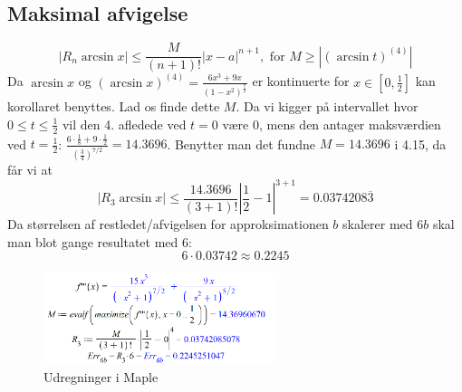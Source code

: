 \documentclass{report}
\begin{document}
\subsection{Maksimal afvigelse}
\begin{equation}
    |R_n\arcsin{x}|\leq\frac{M}{(n+1)!}|x-a|^{n+1},\text{ for }M\geq|(\arcsin{t})^{(4)}|
\end{equation}{}
Da $\arcsin{x}$ og $(\arcsin{x})^{(4)}=\frac{6x^3+9x}{(1-x^2)^{\frac{7}{2}}}$ er kontinuerte for $x\in[0,\frac{1}{2}]$ kan korollaret benyttes. Lad os finde dette $M$. Da vi kigger på intervallet hvor $0\leq t\leq\frac{1}{2}$ vil den 4. afledede ved $t=0$ være 0, mens den antager maksværdien ved $t=\frac{1}{2}$: $\frac{6\cdot\frac{1}{8}+9\cdot\frac{1}{2}}{(\frac{3}{4})^{7/2}}=14.3696$. Benytter man det fundne $M=14.3696$ i 4.15, da får vi at
\begin{equation}
    |R_3\arcsin{x}|\leq\frac{14.3696}{(3+1)!}\left|\frac{1}{2}-1\right|^{3+1}=0.0374208\overline{3}
\end{equation}
Da størrelsen af restledet/afvigelsen for approksimationen $b$ skalerer med $6b$ skal man blot gange resultatet med 6:$$6\cdot0.03742\approx0.2245$$
\begin{figure}[H]
    \centering
    \includegraphics[width=0.6\textwidth]{javaw_IFEFK4Yykw.png}
    \caption{Udregninger i Maple}
\end{figure}
\end{document}

